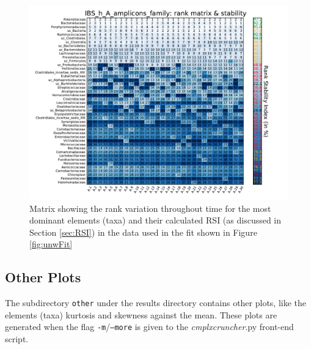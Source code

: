 \documentclass[12pt,oneside,letterpaper]{article}
\newcommand{\CC}[0]{\emph{cmplxcruncher}}
\begin{document}
\begin{figure}
	\centering
	\includegraphics[width=\textwidth]{results/corrank/IBS_h_A_amplicons_family_Rank}
	\caption{Matrix showing the rank variation throughout time for the most dominant elements (taxa) and their calculated RSI (as discussed in Section \ref{sec:RSI}) in the data used in the fit shown in Figure \ref{fig:unwFit}}
	\label{fig:corrank}
\end{figure}

\subsection{Other Plots} 
The subdirectory \texttt{other} under the results directory contains other plots, like the elements (taxa) kurtosis and skewness against the mean. These plots are generated when the flag \texttt{-m}/\texttt{--more} is given to the \CC.py front-end script.
\end{document}
